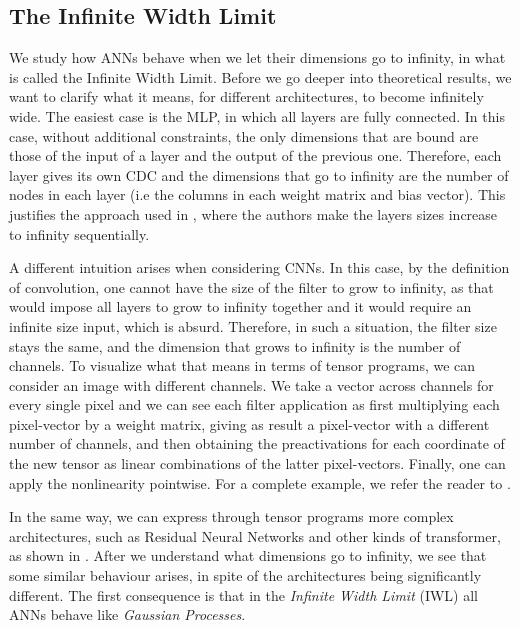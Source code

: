 \documentclass[11pt,notitlepage]{article}
\numberwithin{equation}{section}
\theoremstyle{remark}
\theoremstyle{definition}
\begin{document}
	\subsection{The Infinite Width Limit}\label{subsec:iwl}
	
	We study how ANNs behave when we let their dimensions go to infinity, in what is called the Infinite Width Limit.
	Before we go deeper into theoretical results, we want to clarify what it means, for different architectures, to become infinitely wide.
	The easiest case is the MLP, in which all layers are fully connected.
	In this case, without additional constraints, the only dimensions that are bound are those of the input of a layer and the output of the previous one.
	Therefore, each layer gives its own CDC and the dimensions that go to infinity are the number of nodes in each layer (i.e the columns in each weight matrix and bias vector).
	This justifies the approach used in \cite{jacot2018neural}, where the authors make the layers sizes increase to infinity sequentially.
	
	A different intuition arises when considering CNNs.
	In this case, by the definition of convolution, one cannot have the size of the filter to grow to infinity, as that would impose all layers to grow to infinity together and it would require an infinite size input, which is absurd.
	Therefore, in such a situation, the filter size stays the same, and the dimension that grows to infinity is the number of channels.
	To visualize what that means in terms of tensor programs, we can consider an image with different channels.
	We take a vector across channels for every single pixel and we can see each filter application as first multiplying each pixel-vector by a weight matrix, giving as result a pixel-vector with a different number of channels, and then obtaining the preactivations for each coordinate of the new tensor as linear combinations of the latter pixel-vectors.
	Finally, one can apply the nonlinearity pointwise.
	For a complete example, we refer the reader to \cite[Appendix B.6]{yang2019scaling}.
	
	In the same way, we can express through tensor programs more complex architectures, such as Residual Neural Networks and other kinds of transformer, as shown in \cite[Appendix B]{yang2019scaling}.
	After we understand what dimensions go to infinity, we see that some similar behaviour arises, in spite of the architectures being significantly different.
	The first consequence is that in the \emph{Infinite Width Limit} (IWL) all ANNs behave like \emph{Gaussian Processes}.
	
\end{document}
